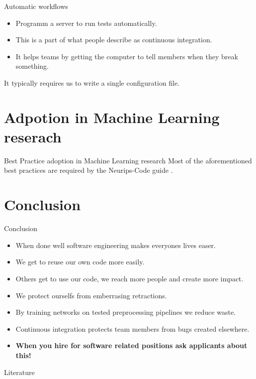 \documentclass{beamer}
\begin{document}
    \begin{frame}{Automatic workflows}
      \begin{itemize}
        \item Programm a server to run tests automatically.
        \item This is a part of what people describe as continuous integration.
        \item It helps teams by getting the computer to tell members when they break something.
      \end{itemize}
      It typically requires us to write a single configuration file.
    \end{frame}

    \section{Adpotion in Machine Learning reserach}
    \begin{frame}{Best Practice adoption in Machine Learning research}
      Most of the aforementioned best practices are required by the Neurips-Code guide \cite{NeuripsCodeguide}.
      \begin{figure}
        \centering
        
        
        
        
      \end{figure}
    \end{frame}


    \section{Conclusion}
    \begin{frame}{Conclusion}
        \begin{itemize}
            \item When done well software engineering makes everyones lives easer.
            \item We get to reuse our own code more easily.
            \item Others get to use our code, we reach more people and create more impact.
            \item We protect ourselfs from emberrasing retractions.
            \item By training networks on tested preprocessing pipelines we reduce waste.
            \item Continuous integration protects team members from bugs created elsewhere.
            \item \textbf{When you hire for software related positions ask applicants about this!}
        \end{itemize}
    \end{frame}

    \begin{frame}[allowframebreaks]{Literature}
      \printbibliography
    \end{frame}
\end{document}
